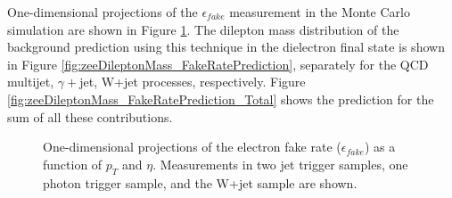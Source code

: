 \documentclass{cmspaper}
\begin{document}
One-dimensional projections of the $\epsilon_{fake}$ measurement in the Monte Carlo simulation are shown in Figure \ref{fig:electronFakeRate}. The dilepton mass distribution of the background prediction using this technique in the dielectron final state is shown in Figure \ref{fig:zeeDileptonMass_FakeRatePrediction}, separately for the QCD multijet, $\gamma+$jet, W+jet processes, respectively. Figure \ref{fig:zeeDileptonMass_FakeRatePrediction_Total} shows the prediction for the sum of all these contributions. 


\begin{figure}[htb]
  \begin{center}
    
    \caption{One-dimensional projections of the electron fake rate ($\epsilon_{fake}$) as a function of $p_{T}$ and $\eta$. Measurements in two jet trigger samples, one photon trigger sample, and the W+jet sample are shown. }
    \label{fig:electronFakeRate}
  \end{center}
\end{figure}
\end{document}
